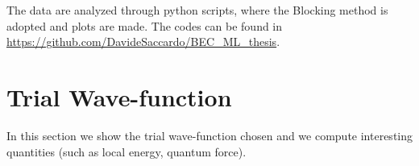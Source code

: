 The data are analyzed through python scripts, where the Blocking method is adopted and plots are made. The codes can be found in \url{https://github.com/DavideSaccardo/BEC_ML_thesis}.

\section{Trial Wave-function}
In this section we show the trial wave-function chosen %
and we compute interesting quantities (such as local energy, quantum force). 
%
%
%
